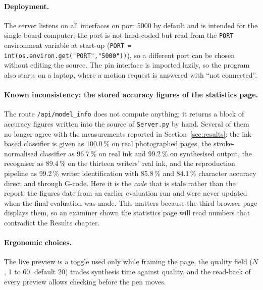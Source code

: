 \paragraph{Deployment.}
The server listens on all interfaces on port 5000 by default and is intended for the single-board computer; the port is not hard-coded but read from the \texttt{PORT} environment variable at start-up (\texttt{PORT = int(os.environ.get("PORT","5000"))}), so a different port can be chosen without editing the source.
The pin interface is imported lazily, so the program also starts on a laptop, where a motion request is answered with ``not connected''.

\paragraph{Known inconsistency: the stored accuracy figures of the statistics page.}
The route \texttt{/api/model\_info} does not compute anything; it returns a block of accuracy figures written into the source of \texttt{Server.py} by hand.
Several of them no longer agree with the measurements reported in Section~\ref{sec:results}: the ink-based classifier is given as 100.0\,\% on real photographed pages, the stroke-normalised classifier as 96.7\,\% on real ink and 99.2\,\% on synthesised output, the recogniser as 89.4\,\% on the thirteen writers' real ink, and the reproduction pipeline as 99.2\,\% writer identification with 85.8\,\% and 84.1\,\% character accuracy direct and through G-code.
Here it is the \emph{code} that is stale rather than the report: the figures date from an earlier evaluation run and were never updated when the final evaluation was made.
This matters because the third browser page displays them, so an examiner shown the statistics page will read numbers that contradict the Results chapter.

\paragraph{Ergonomic choices.}
The live preview is a toggle used only while framing the page, the quality field ($N$, 1 to 60, default 20) trades synthesis time against quality, and the read-back of every preview allows checking before the pen moves.


